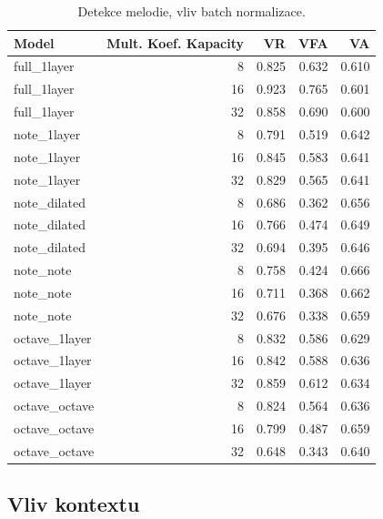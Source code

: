 \begin{table}[h!]
\centering
    \begin{tabular}{lrrrr}
    \toprule
            Model & Mult. Koef. Kapacity &    VR &   VFA &    VA \\
    \midrule
    full\_1layer &                    8 & 0.825 & 0.632 & 0.610 \\
    full\_1layer &                   16 & 0.923 & 0.765 & 0.601 \\
    full\_1layer &                   32 & 0.858 & 0.690 & 0.600 \\
    note\_1layer &                    8 & 0.791 & 0.519 & 0.642 \\
    note\_1layer &                   16 & 0.845 & 0.583 & 0.641 \\
    note\_1layer &                   32 & 0.829 & 0.565 & 0.641 \\
    note\_dilated &                    8 & 0.686 & 0.362 & 0.656 \\
    note\_dilated &                   16 & 0.766 & 0.474 & 0.649 \\
    note\_dilated &                   32 & 0.694 & 0.395 & 0.646 \\
        note\_note &                    8 & 0.758 & 0.424 & 0.666 \\
        note\_note &                   16 & 0.711 & 0.368 & 0.662 \\
        note\_note &                   32 & 0.676 & 0.338 & 0.659 \\
    octave\_1layer &                    8 & 0.832 & 0.586 & 0.629 \\
    octave\_1layer &                   16 & 0.842 & 0.588 & 0.636 \\
    octave\_1layer &                   32 & 0.859 & 0.612 & 0.634 \\
    octave\_octave &                    8 & 0.824 & 0.564 & 0.636 \\
    octave\_octave &                   16 & 0.799 & 0.487 & 0.659 \\
    octave\_octave &                   32 & 0.648 & 0.343 & 0.640 \\
    \bottomrule
    \end{tabular}

\caption{Detekce melodie, vliv batch normalizace.}\label{tab:voicing_capacity}
\end{table}

\subsection{Vliv kontextu}

